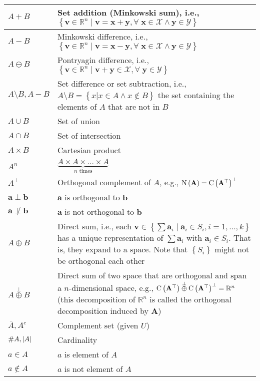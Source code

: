 \documentclass{article}
\begin{document}
\begin{xltabular}{\textwidth}{XX}
    \(A + B\) & Set addition (Minkowski sum), i.e., \(\left\{ \mathbf{v} \in \mathbb{R}^{n} \mid \mathbf{v} = \mathbf{x}+\mathbf{y}, \forall \; \mathbf{x} \in \mathcal{X} \wedge \mathbf{y} \in \mathcal{Y} \right\}\) \cite{kouvaritakisModelPredictiveControl2016}\\ \hline
    \(A - B\) &  Minkowski difference, i.e., \(\left\{ \mathbf{v} \in \mathbb{R}^{n} \mid \mathbf{v} = \mathbf{x}-\mathbf{y}, \forall \; \mathbf{x} \in \mathcal{X} \wedge \mathbf{y} \in \mathcal{Y} \right\}\)\\ \hline
    \(A \ominus B\) & Pontryagin difference, i.e., \(\left\{ \mathbf{v} \in \mathbb{R}^{n} \mid \mathbf{v} + \mathbf{y} \in \mathcal{X} , \forall \; \mathbf{y} \in \mathcal{Y} \right\}\) \cite{kouvaritakisModelPredictiveControl2016}\\ \hline
    \(A \setminus B, A-B\) & Set difference or set subtraction, i.e., \(A \setminus B = \left\{ x \vert x \in A \wedge x \not\in B \right\}\) the set containing the elements of \(A\) that are not in \(B\) \cite{rosenDiscreteMathematicsIts2011}\\ \hline
    \(A \cup B\) & Set of union\\ \hline
    \(A \cap B\) & Set of intersection\\ \hline
    \(A \times B\) & Cartesian product\\ \hline
    \(A^n\) & \(\underbrace{A \times A \times \dots \times A}_{n \text{ times}}\)\\ \hline
    \(A^{\perp}\) & Orthogonal complement of \(A\), e.g., \(\operatorname{N}\left(\mathbf{A}\right) = \operatorname{C}\left(\mathbf{A}^{\top}\right)^{\perp}\) \cite{boydConvexOptimization2004}\\ \hline
    \(\mathbf{a} \perp \mathbf{b}\)   & \(\mathbf{a}\) is orthogonal to \(\mathbf{b}\)\\ \hline
    \(\mathbf{a} \not\perp \mathbf{b}\)            & \(\mathbf{a}\) is not orthogonal to \(\mathbf{b}\)\\
    \(A \oplus B\) & Direct sum, i.e., each \(\mathbf{v} \in \left\{ \sum \mathbf{a}_i \mid \mathbf{a}_i \in S_i, i=1,\dots,k \right\}\) has a unique representation of \(\sum \mathbf{a}_i\) with \(\mathbf{a}_i \in S_i\). That is, they expand to a space. Note that \(\left\{ S_i \right\}\) might not be orthogonal each other \cite{golubMatrixComputations2013}\\ \hline
    \(A \overset{\perp}{\oplus} B\) & Direct sum of two space that are orthogonal and span a \(n\)-dimensional space, e.g., \(\operatorname{C}\left(\mathbf{A}^{\top}\right) \overset{\perp}{\oplus} \operatorname{C}\left(\mathbf{A}^{\top}\right)^{\perp} = \mathbb{R}^{n}\) (this decomposition of \(\mathbb{R}^{n}\) is called the orthogonal decomposition induced by \(\mathbf{A}\)) \cite{boydConvexOptimization2004}\\ \hline
    \(\bar{A}, A^{c}\) & Complement set (given $U$)\\ \hline
    \(\#A, \abs{A}\) & Cardinality\\ \hline
    \(a \in A\)& \(a\) is element of \(A\) \\ \hline
    \(a \notin A\)& \(a\) is not element of \(A\) \\ \hline
\end{xltabular}
\end{document}
